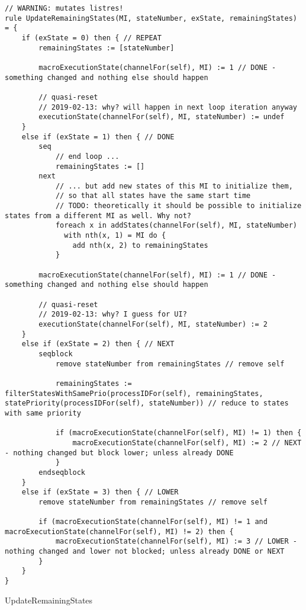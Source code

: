\begin{listing}[H]
\begin{verbatim}
// WARNING: mutates listres!
rule UpdateRemainingStates(MI, stateNumber, exState, remainingStates) = {
    if (exState = 0) then { // REPEAT
        remainingStates := [stateNumber]

        macroExecutionState(channelFor(self), MI) := 1 // DONE - something changed and nothing else should happen

        // quasi-reset
        // 2019-02-13: why? will happen in next loop iteration anyway
        executionState(channelFor(self), MI, stateNumber) := undef
    }
    else if (exState = 1) then { // DONE
        seq
            // end loop ...
            remainingStates := []
        next
            // ... but add new states of this MI to initialize them,
            // so that all states have the same start time
            // TODO: theoretically it should be possible to initialize states from a different MI as well. Why not?
            foreach x in addStates(channelFor(self), MI, stateNumber)
              with nth(x, 1) = MI do {
                add nth(x, 2) to remainingStates
            }

        macroExecutionState(channelFor(self), MI) := 1 // DONE - something changed and nothing else should happen

        // quasi-reset
        // 2019-02-13: why? I guess for UI?
        executionState(channelFor(self), MI, stateNumber) := 2
    }
    else if (exState = 2) then { // NEXT
        seqblock
            remove stateNumber from remainingStates // remove self

            remainingStates := filterStatesWithSamePrio(processIDFor(self), remainingStates, statePriority(processIDFor(self), stateNumber)) // reduce to states with same priority

            if (macroExecutionState(channelFor(self), MI) != 1) then {
                macroExecutionState(channelFor(self), MI) := 2 // NEXT - nothing changed but block lower; unless already DONE
            }
        endseqblock
    }
    else if (exState = 3) then { // LOWER
        remove stateNumber from remainingStates // remove self

        if (macroExecutionState(channelFor(self), MI) != 1 and macroExecutionState(channelFor(self), MI) != 2) then {
            macroExecutionState(channelFor(self), MI) := 3 // LOWER - nothing changed and lower not blocked; unless already DONE or NEXT
        }
    }
}
\end{verbatim}
\caption{UpdateRemainingStates}
\label{lst:asm:UpdateRemainingStates}
\end{listing}




